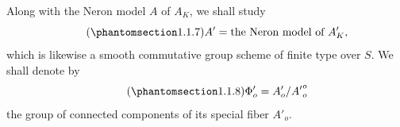 Along with the Neron model $A$ of $A_K$, we shall study
\begin{equation}\tag{\SGARefTarget{sga7.sga7i.eix.n1-1-7}{1.1.7}}
 A'=\text{the Neron model of }A'_K,
\end{equation}
which is likewise a smooth commutative group scheme of finite type over
$S$.  We shall denote by
\begin{equation}\tag{\SGARefTarget{sga7.sga7i.eix.n1-1-8}{1.1.8}}
 \Phi'_o=A'_o/{A'}_o^o
\end{equation}
the group of connected components of its special fiber $A'_o$.
